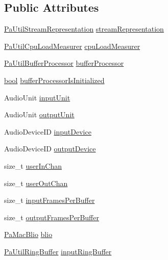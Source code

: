 \subsection*{Public Attributes}
\begin{DoxyCompactItemize}
\item 
\hyperlink{struct_pa_util_stream_representation}{Pa\+Util\+Stream\+Representation} \hyperlink{struct_pa_mac_core_stream_a37e7f3609f183162f0938ae24dd838f7}{stream\+Representation}
\item 
\hyperlink{struct_pa_util_cpu_load_measurer}{Pa\+Util\+Cpu\+Load\+Measurer} \hyperlink{struct_pa_mac_core_stream_a589be1f91f8332bba6cc1b0b006f9b80}{cpu\+Load\+Measurer}
\item 
\hyperlink{struct_pa_util_buffer_processor}{Pa\+Util\+Buffer\+Processor} \hyperlink{struct_pa_mac_core_stream_aa4c9fb315b5a2a91164f62d40e1f35a7}{buffer\+Processor}
\item 
\hyperlink{mac_2config_2i386_2lib-src_2libsoxr_2soxr-config_8h_abb452686968e48b67397da5f97445f5b}{bool} \hyperlink{struct_pa_mac_core_stream_ac6468bfef6a09086a8ba75bd1825b3f4}{buffer\+Processor\+Is\+Initialized}
\item 
Audio\+Unit \hyperlink{struct_pa_mac_core_stream_a18489f920abd98c28ec23a08129a2a94}{input\+Unit}
\item 
Audio\+Unit \hyperlink{struct_pa_mac_core_stream_a834e659582a0b68100a0095ac6d45c7e}{output\+Unit}
\item 
Audio\+Device\+ID \hyperlink{struct_pa_mac_core_stream_a84ab00c3940677753cbcfaa0b4497817}{input\+Device}
\item 
Audio\+Device\+ID \hyperlink{struct_pa_mac_core_stream_ae982506be4fb075f57798b322893c477}{output\+Device}
\item 
size\+\_\+t \hyperlink{struct_pa_mac_core_stream_a8117390b82eb0f6aa238c1c0272f96b2}{user\+In\+Chan}
\item 
size\+\_\+t \hyperlink{struct_pa_mac_core_stream_aa672c86d838eb7f11ee03e939b7a58e5}{user\+Out\+Chan}
\item 
size\+\_\+t \hyperlink{struct_pa_mac_core_stream_a33e3792b0bebe4a05a5e794ec087e4c3}{input\+Frames\+Per\+Buffer}
\item 
size\+\_\+t \hyperlink{struct_pa_mac_core_stream_a6ba0534d56d18552f4dd23b5922b6caa}{output\+Frames\+Per\+Buffer}
\item 
\hyperlink{struct_pa_mac_blio}{Pa\+Mac\+Blio} \hyperlink{struct_pa_mac_core_stream_aeb24427958d583443b64443a9e25cdec}{blio}
\item 
\hyperlink{struct_pa_util_ring_buffer}{Pa\+Util\+Ring\+Buffer} \hyperlink{struct_pa_mac_core_stream_a1c12d9d7f7f8174127c8ae35b96991dd}{input\+Ring\+Buffer}

\end{DoxyCompactItemize}
